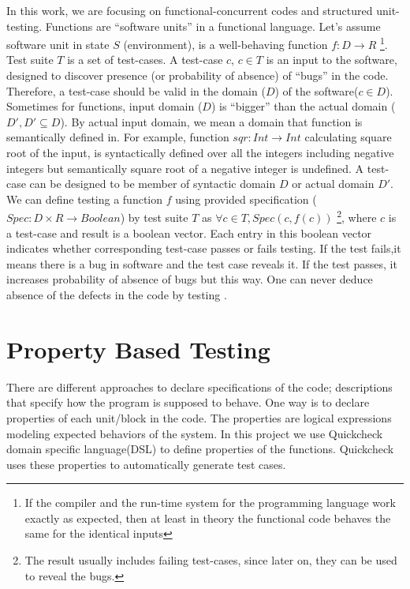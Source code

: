 \documentclass[12pt,a4paper]{report}
\begin{document}
In this work, we are focusing on functional-concurrent codes and structured unit-testing. Functions are ``software units'' in a functional language.
Let's assume software unit in state $S$ (environment), is a well-behaving function $f:D \rightarrow R$
\footnote{If the compiler and the run-time system for the programming language work exactly as expected, then at least in theory the functional code
 behaves the same for the identical inputs}.
Test suite $T$ is a set of test-cases. A test-case $c$, $c \in T$ is an input to the software, designed to discover presence (or probability of absence)
 of ``bugs'' in the code. Therefore, a test-case should be valid in the domain ($D$) of the software($c \in D$).
Sometimes for functions, input domain ($D$) is ``bigger'' than the actual domain ($D',D' \subseteq D$). By actual input domain, we mean a domain that 
function is semantically defined in. For example, function 
$sqr:Int \rightarrow Int$ calculating square root of the input, is syntactically defined over all the integers including negative integers but 
semantically square root of a negative integer is undefined. A test-case can be designed to be member of syntactic domain $D$ or actual domain $D'$.     
We can define testing a function $f$ using provided specification ($Spec:D \times R \rightarrow Boolean$) by test suite $T$ as
 $\forall c \in T, Spec (c,f(c))$ \footnote{The result usually includes failing test-cases, since later on, they can be used to reveal the bugs.}, where
 $c$ is a test-case and result is a boolean vector. Each entry in this boolean vector indicates whether corresponding
test-case passes or fails testing. If the test fails,it means there is a bug in software and the
test case reveals it. If the test passes, it increases probability of absence of bugs but this way. One can never
deduce absence of the defects in the code by testing \cite{dijkstra1970notes,Dahl:1972:SP:1243380}.

\section{Property Based Testing}
There are different approaches to declare specifications of the code; descriptions that specify how the program is supposed to behave. One way is to
 declare properties of each unit/block in the code. The properties are logical expressions modeling expected behaviors of the system. 
In this project we use Quickcheck domain specific language(DSL) to define properties of the functions. Quickcheck uses these properties
to automatically generate test cases. %
\end{document}
